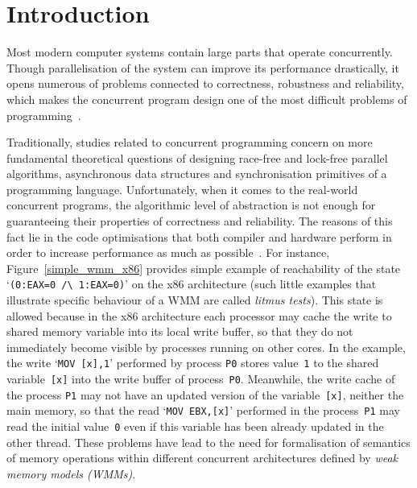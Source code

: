 \chapter{Introduction}
\label{ch:intro}


Most modern computer systems contain large parts that operate concurrently. Though parallelisation of the system can improve its performance drastically, it opens numerous of problems connected to correctness, robustness and reliability, which makes the concurrent program design one of the most difficult problems of programming~\cite{mckenney2017parallel}.

Traditionally, studies related to concurrent programming concern on more fundamental theoretical questions of designing race-free and lock-free parallel algorithms, asynchronous data structures and synchronisation primitives of a programming language.
Unfortunately, when it comes to the real-world concurrent programs, the algorithmic level of abstraction is not enough for guaranteeing their properties of correctness and reliability.
The reasons of this fact lie in the code optimisations that both compiler and hardware perform in order to increase performance as much as possible~\cite{adve1996shared}.
For instance, Figure~\ref{simple_wmm_x86} provides simple example of reachability of the state `\texttt{(0:EAX=0~/\textbackslash~1:EAX=0)}' on the x86 architecture (such little examples that illustrate specific behaviour of a WMM are called \textit{litmus tests}).
This state is allowed because in the x86 architecture each processor may cache the write to shared memory variable into its local write buffer, so that they do not immediately become visible by processes running on other cores.
In the example, the write `\texttt{MOV~[x],1}' performed by process \texttt{P0} stores value~\texttt{1} to the shared variable~\texttt{[x]} into the write buffer of process~\texttt{P0}.
Meanwhile, the write cache of the process \texttt{P1} may not have an updated version of the variable~\texttt{[x]}, neither the main memory, so that the read `\texttt{MOV~EBX,[x]}' performed in the process~\texttt{P1} may read the initial value~\texttt{0} even if this variable has been already updated in the other thread.
These problems have lead to the need for formalisation of semantics of memory operations within different concurrent architectures defined by \textit{weak memory models (WMMs)}.


